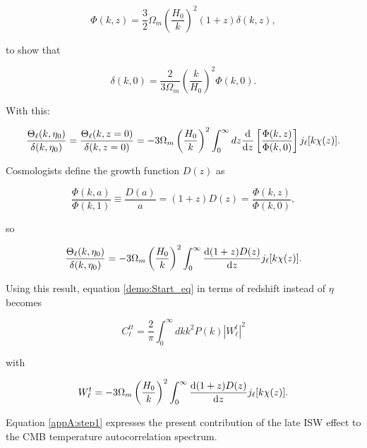 \documentclass[openany,a4paper,12pt,oneside]{book}
\begin{document}
\begin{spacing}{1.5}
\begin{equation}
	\Phi(k,z)=\frac{3}{2}\Omega_m \left(\frac{H_0}{k}\right)^2(1+z)\delta(k,z),
\end{equation}

\noindent to show that

\begin{equation}
	\delta(k,0)=\frac{2}{3\Omega_m}\left(\frac{k}{H_0}\right)^2\Phi(k,0).
\end{equation}

With this:

\begin{equation}
	\frac{\Theta_\ell(k,\eta_0)}{\delta(k,\eta_0)}=\frac{\Theta_\ell(k,z=0)}{\delta(k,z=0)}=-3\Omega_m\left(\frac{H_0}{k}\right)^2\int_0^\infty dz \dv{}{z}\left[\frac{\Phi(k,z)}{\Phi(k,0)}\right]j_\ell[k\chi(z)].
\end{equation}

Cosmologists define the growth function $D(z)$ as

\begin{equation}
	\frac{\Phi(k,a)}{\Phi(k,1)}\equiv\frac{D(a)}{a}=(1+z)D(z)=\frac{\Phi(k,z)}{\Phi(k,0)},
\end{equation}

so

\begin{equation}
	\frac{\Theta_\ell(k,\eta_0)}{\delta(k,\eta_0)}=-3\Omega_m\left(\frac{H_0}{k}\right)^2\int_0^\infty \dv{(1+z)D(z)}{z}j_\ell[k\chi(z)].
\end{equation}

Using this result, equation \eqref{demo:Start_eq} in terms of redshift instead of $\eta$ becomes

\begin{equation}\label{AppA:eq_final}
	C_\ell^{tt}=\frac{2}{\pi}\int_0^\infty dk k^2P(k)|W_\ell^t|^2
\end{equation}

\noindent with 

\begin{equation}
	W_\ell^t=-3\Omega_m\left(\frac{H_0}{k}\right)^2\int_0^\infty \dv{(1+z)D(z)}{z}j_\ell[k\chi(z)].
\end{equation}

Equation \eqref{appA:step1} expresses the present contribution of the late ISW  effect to the CMB temperature autocorrelation spectrum.






\end{spacing}
\endgroup

\printbibliography
\end{document}
